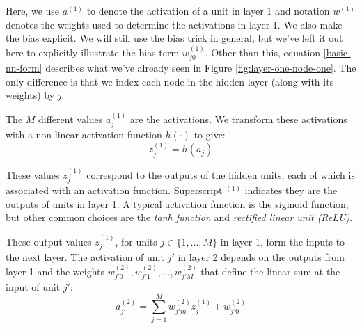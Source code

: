       Here, we use $a^{(1)}$ to denote the activation of a unit in layer 1 and notation $w^{(1)}$  denotes the weights used to determine the activations in layer 1. We also make the bias explicit.
      We will still use the bias trick in general, but we've left it out here to
      explicitly illustrate the bias term
      $w_{j0}^{(1)}$.
      Other than this,  equation \ref{basic-nn-form} describes what we've already seen in Figure \ref{fig:layer-one-node-one}. The only difference is that we index each node in the hidden layer (along with its weights) by $j$.

      
      The $M$ different values $a^{(1)}_{j}$ are the  activations. We transform these activations with a non-linear activation function $h(\cdot)$ to give:
\begin{equation} \label{basic-nn-z-outputs}
	z^{(1)}_{j} = h(a_{j})
      \end{equation}
      

These values $z^{(1)}_{j}$ correspond to the outputs of the hidden units, each of which is associated with an activation function. Superscript $^{(1)}$ indicates they are the outputs of units in layer 1.
A typical activation function is the  sigmoid function, but  other common choices are the {\em tanh function} and {\em  rectified linear unit (ReLU)}.

These output values $z^{(1)}_{j}$, for units $j\in \{1,\ldots,M\}$ in layer 1,
form the inputs to the next layer. The activation of unit $j'$ in layer 2 depends on the outputs from layer 1 and the weights $w^{(2)}_{j'0},w^{(2)}_{j'1},\ldots,w^{(2)}_{j'M}$ that define the linear sum at the input of unit $j'$:
%
\begin{equation} \label{basic-nn-form-next-layer}
	a^{(2)}_{j'} = \sum_{j=1}^{M} w_{j'm}^{(2)} z^{(1)}_{j} + w_{j'0}^{(2)}
      \end{equation}
      
